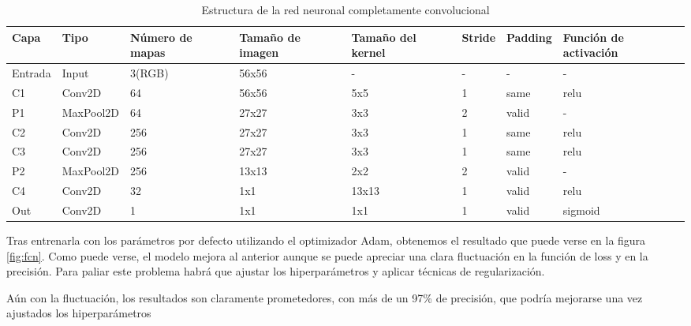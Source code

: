 \begin{table}[h]
  \centering
  \begin{tabular}{|l|l|p{1.4cm}|p{1.4cm}|p{1.5cm}|l|l|p{1.4cm}|}
    \hline
    Capa    & Tipo      & Número de mapas & Tamaño de imagen & Tamaño del kernel & Stride & Padding & Función de activación \\ \hline
    Entrada & Input     & 3(RGB)          & 56x56            & -                 & -      & -       & -                     \\ \hline
    C1      & Conv2D    & 64              & 56x56            & 5x5               & 1      & same    & relu                  \\ \hline
    P1      & MaxPool2D & 64              & 27x27            & 3x3               & 2      & valid   & -                     \\ \hline
    C2      & Conv2D    & 256             & 27x27            & 3x3               & 1      & same    & relu                  \\ \hline
    C3      & Conv2D    & 256             & 27x27            & 3x3               & 1      & same    & relu                  \\ \hline
    P2      & MaxPool2D & 256             & 13x13            & 2x2               & 2      & valid   & -                     \\ \hline
    C4      & Conv2D    & 32              & 1x1              & 13x13             & 1      & valid   & relu                  \\ \hline
    Out     & Conv2D    & 1               & 1x1              & 1x1               & 1      & valid   & sigmoid               \\ \hline
  \end{tabular}
  \caption{Estructura de la red neuronal completamente convolucional}
  \label{tabla:fcn}
\end{table}

Tras entrenarla con los parámetros por defecto utilizando el optimizador Adam, obtenemos el resultado que puede verse en la figura \ref{fig:fcn}. Como puede verse, el modelo mejora al anterior aunque se puede apreciar una clara fluctuación en la función de loss y en la precisión. Para paliar este problema habrá que ajustar los hiperparámetros y aplicar técnicas de regularización.

Aún con la fluctuación, los resultados son claramente prometedores, con más de un 97\% de precisión, que podría mejorarse una vez ajustados los hiperparámetros

